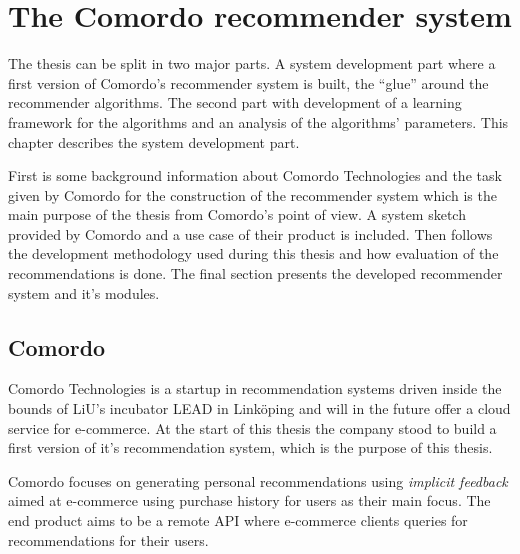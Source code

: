 
\chapter{The Comordo recommender system}\label{cha:recsys}

The thesis can be split in two major parts. A system development part where a first version of Comordo's recommender system is built, the ``glue'' around the recommender algorithms. The second part with development of a learning framework for the algorithms and an analysis of the algorithms' parameters. This chapter describes the system development part.

First is some background information about Comordo Technologies and the task given by Comordo for the construction of the recommender system which is the main purpose of the thesis from Comordo's point of view. A system sketch provided by Comordo and a use case of their product is included. Then follows the development methodology used during this thesis and how evaluation of the recommendations is done. The final section presents the developed recommender system and it's modules.


\section{Comordo}

Comordo Technologies is a startup in recommendation systems driven inside the bounds of LiU's incubator LEAD in Linköping and will in the future offer a cloud service for e-commerce. At the start of this thesis the company stood to build a first version of it's recommendation system, which is the purpose of this thesis.

Comordo focuses on generating personal recommendations using \textit{implicit feedback} aimed at e-commerce using purchase history for users as their main focus. The end product aims to be a remote API where e-commerce clients queries for recommendations for their users.







\newpage
